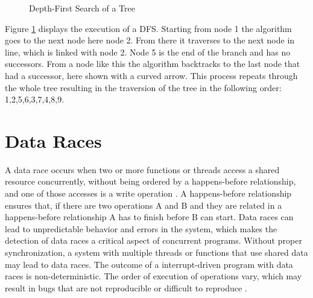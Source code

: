 \documentclass[
fancyheadings, %
%
%
]{stsreprt}
\begin{document}
{\begin{figure}[H]
		\caption{Depth-First Search of a Tree}
		\label{dfstree}
		\end{figure}
		Figure \ref{dfstree} displays the execution of a \ac{DFS}. Starting from node 1 the algorithm goes to the next node here node 2. From there it traverses to the next node in line, which is linked with node 2. Node 5 is the end of the branch and has no successors. From a node like this the algorithm backtracks to the last node that had a successor, here shown with a curved arrow. This process repeats through the whole tree resulting in the traversion of the tree in the following order: 1,2,5,6,3,7,4,8,9.
		\section{Data Races}
		
		A data race occurs when two or more functions or threads access a shared resource concurrently, without being ordered by a happens-before relationship, and one of those accesses is a write operation \cite{chen2011}. A happens-before relationship ensures that, if there are two operations A and B and they are related in a happens-before relationship A has to finish before B can start. Data races can lead to unpredictable behavior and errors in the system, which makes the detection of data races a critical aspect of concurrent programs. Without proper synchronization, a system with multiple threads or functions that use shared data may lead to data races. The outcome of a interrupt-driven program with data races is non-deterministic. The order of execution of operations vary, which may result in bugs that are not reproducible or difficult to reproduce \cite{chen2011}.
		
}
\end{document}
